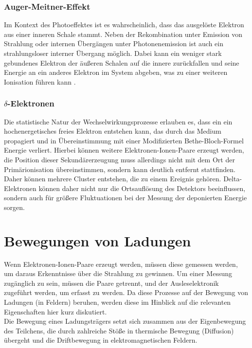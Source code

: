 		\subsubsection{Auger-Meitner-Effekt}
			Im Kontext des Photoeffektes ist es wahrscheinlich, dass das ausgelöste Elektron aus einer inneren Schale stammt. Neben der Rekombination unter Emission von Strahlung oder internen Übergängen unter Photonenemission ist auch ein strahlungsloser interner Übergang möglich. Dabei kann ein weniger stark gebundenes Elektron der äußeren Schalen auf die innere zurückfallen und seine Energie an ein anderes Elektron im System abgeben, was zu einer weiteren Ionisation führen kann \cite{Sauli_Multiwire}. 
			
		\subsubsection{$\delta$-Elektronen}
			Die statistische Natur der Wechselwirkungsprozesse erlauben es, dass ein ein hochenergetisches freies Elektron entstehen kann, das durch das Medium propagiert und in Übereinstimmung mit einer Modifizierten Bethe-Bloch-Formel \cite{Leo} Energie verliert. Hierbei können weitere Elektronen-Ionen-Paare erzeugt werden, die Position dieser Sekundärerzeugung muss allerdings nicht mit dem Ort der Primärionisation übereinstimmen, sondern kann deutlich entfernt stattfinden. Daher können mehrere Cluster entstehen, die zu einem Ereignis gehören. Delta-Elektronen können daher nicht nur die Ortsauflösung des Detektors beeinflussen, sondern auch für größere Fluktuationen bei der Messung der deponierten Energie sorgen.
			
		\newpage	
		
	\section{Bewegungen von Ladungen}		
	Wenn Elektronen-Ionen-Paare erzeugt werden, müssen diese gemessen werden, um daraus Erkenntnisse über die Strahlung zu gewinnen. Um einer Messung zugänglich zu sein, müssen die Paare getrennt, und der Ausleselektronik zugeführt werden, um erfasst zu werden. Da diese Prozesse auf der Bewegung von Ladungen (in Feldern) beruhen, werden diese im Hinblick auf die relevanten Eigenschaften hier kurz diskutiert.\\
	Die Bewegung eines Ladungsträgers setzt sich zusammen aus der Eigenbewegung des Teilchens, die durch zahlreiche Stöße in thermische Bewegung (Diffusion) übergeht und die Driftbewegung in elektromagnetischen Feldern.
	
